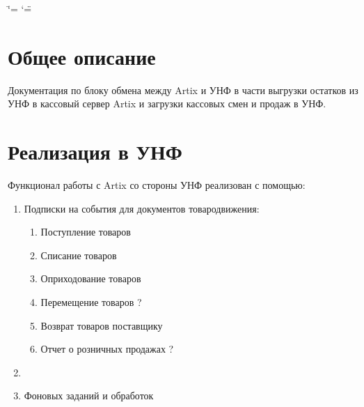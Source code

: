 \documentclass[twoside,11pt,a4paper,notitlepage]{report}
\date{\displaydate{date}}
\begin{document}
\ifdefined\shorthandoff
  \ifnum\catcode`\=\string=\active\shorthandoff{=}\fi
  \ifnum\catcode`\"=\active{}\fi
\fi

\pagestyle{empty}

\pagestyle{plain}
\label{\detokenize{index::doc}}





\chapter{Общее описание}
\label{\detokenize{description:id1}}\label{\detokenize{description::doc}}

Документация по блоку обмена между Artix и УНФ в части выгрузки остатков из УНФ в кассовый сервер Artix и загрузки кассовых смен и продаж в УНФ.








\chapter{Реализация в УНФ}
\label{\detokenize{unf:id1}}\label{\detokenize{unf::doc}}

Функционал работы с Artix со стороны УНФ реализован с помощью:
\begin{enumerate}

\item {} 

Подписки на события для документов товародвижения:
\begin{enumerate}

\item {} 

Поступление товаров

\item {} 

Списание товаров

\item {} 

Оприходование товаров

\item {} 

Перемещение товаров ?

\item {} 

Возврат товаров поставщику

\item {} 

Отчет о розничных продажах ?

\end{enumerate}

\item {} 



\item {} 

Фоновых заданий и обработок

\end{enumerate}
\end{document}

